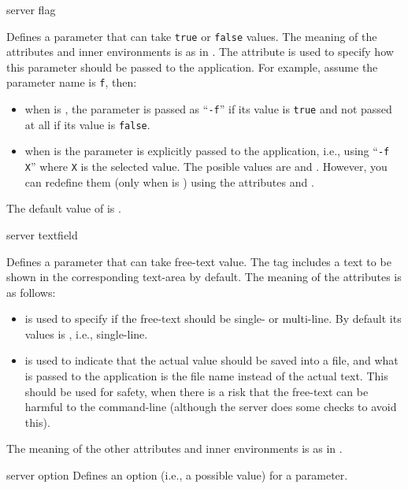 \bigskip
\xmlstruct
{server}
{flag}
{%
%
  Defines a parameter that can take \texttt{true} or \texttt{false}
  values. The meaning of the attributes and inner environments is as
  in .  The attribute
   is used to specify how this parameter
  should be passed to the application. For example, assume the
  parameter name is \texttt{f}, then:
  \begin{itemize}
  \item when  is , the
    parameter is passed as ``\texttt{-f}'' if its value is
    \texttt{true} and not passed at all if its value is
    \texttt{false}.

  \item when  is  the
    parameter is explicitly passed to the application, i.e., using
    ``\texttt{-f X}'' where \texttt{X} is the selected value. The
    posible values are  and
    . However, you can redefine them
     (only when  is
    ) using the attributes
     and .
  \end{itemize}
%
  The default value of  is
  .
%
}


\bigskip
\xmlstruct
{server}
{textfield}
{%
%
  Defines a parameter that can take free-text value.  The
   tag includes a text to be shown in the
  corresponding text-area by default.  The meaning of the attributes
  is as follows:
%
\begin{itemize}
%
\item {} is used to specify if the free-text
  should be single- or multi-line. By default its values is
  , i.e., single-line.
%
\item {} is used to indicate that the actual
  value should be saved into a file, and what is passed to the
  application is the file name instead of the actual text. 
  This should be used for safety, when there is a risk that the
  free-text can be harmful to the command-line (although the server
  does some checks to avoid this).
%
\end{itemize}
%
The meaning of the other attributes and inner environments is as in
.
%
}


\bigskip
\xmlstruct
{server}
{option}
{%
Defines an option (i.e., a possible value) for a parameter.
}


